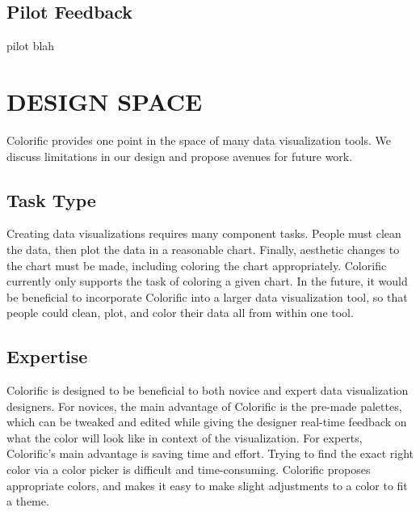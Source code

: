 \documentclass{article}
\newcommand{\system}{Colorific\xspace}
\begin{document}

\subsection{Pilot Feedback}
pilot blah

\section{DESIGN SPACE}
\system provides one point in the space of many data visualization tools. We discuss limitations in our design and propose avenues for future work. 

\subsection{Task Type}
Creating data visualizations requires many component tasks. People must clean the data, then plot the data in a reasonable chart. Finally, aesthetic changes to the chart must be made, including coloring the chart appropriately. \system currently only supports the task of coloring a given chart. In the future, it would be beneficial to incorporate \system into a larger data visualization tool, so that people could clean, plot, and color their data all from within one tool. 

\subsection{Expertise}
\system is designed to be beneficial to both novice and expert data visualization designers. For novices, the main advantage of \system is the pre-made palettes, which can be tweaked and edited while giving the designer real-time feedback on what the color will look like in context of the visualization. For experts, \system's main advantage is saving time and effort. Trying to find the exact right color via a color picker is difficult and time-consuming. \system proposes appropriate colors, and makes it easy to make slight adjustments to a color to fit a theme. 
\end{document}
